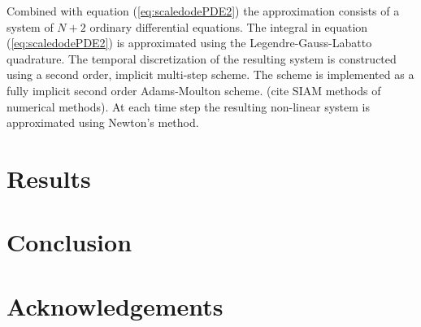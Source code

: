 \documentclass[12pt]{article}
\begin{document}
Combined with equation (\ref{eq:scaledodePDE2}) the approximation
consists of a system of $N+2$ ordinary differential equations. The
integral in equation (\ref{eq:scaledodePDE2}) is approximated using
the Legendre-Gauss-Labatto quadrature. The temporal discretization of
the resulting system is constructed using a second order, implicit
multi-step scheme. The scheme is implemented as a fully implicit
second order Adams-Moulton scheme.  (cite SIAM methods of numerical
methods). At each time step the resulting non-linear system is
approximated using Newton's method.

\section{Results}

\section{Conclusion}

\section{Acknowledgements}
\end{document}
